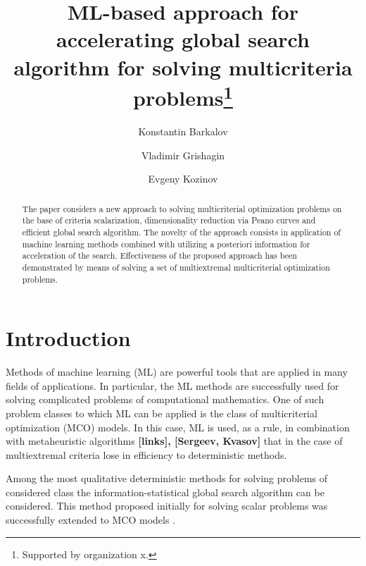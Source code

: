 \documentclass[runningheads]{llncs}
\begin{document}
%
\title{ML-based approach for accelerating global search algorithm for solving multicriteria problems\thanks{Supported by organization x.}}
%
%
\author{Konstantin Barkalov \and
Vladimir Grishagin \and
Evgeny Kozinov}
%
%
%
\maketitle              %
%
\begin{abstract}
The paper considers a new approach to solving multicriterial optimization problems on the base of criteria scalarization, dimensionality reduction via Peano curves and efficient global search algorithm. The novelty of the approach consists in application of machine learning methods combined with utilizing a posteriori information for acceleration of the search. Effectiveness of the proposed approach has been demonstrated by means of solving a set of multiextremal multicriterial optimization problems.

\end{abstract}
%
%
%
\section{Introduction}
Methods of machine learning (ML) are powerful tools that are applied in many fields of applications. In particular, the ML methods are successfully used for solving complicated problems of computational mathematics. One of such problem classes to which ML can be applied is the class of multicriterial optimization (MCO) models. In this case, ML is used, as a rule, in combination with metaheuristic algorithms \textbf{[links], [Sergeev, Kvasov]} that in the case of multiextremal criteria lose in efficiency to deterministic methods.

Among the most qualitative deterministic methods for solving problems of considered class the information-statistical global search algorithm \cite{Strongin2000,Sergeyev2013} can be considered. This method proposed initially for solving scalar problems was successfully extended to MCO models \cite{GergelKozinovAPI2016,Gergel2018}.
\end{document}
